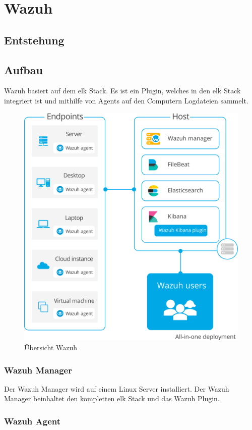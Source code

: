 \chapter{Wazuh}
\section{Entstehung}

\section{Aufbau}
Wazuh basiert auf dem \acrfull{elk} Stack. 
Es ist ein Plugin, welches in den \acrshort{elk} Stack integriert ist und mithilfe von Agents auf den Computern Logdateien sammelt.

\begin{figure}[H]
    \centering
    \includegraphics[width=0.7\linewidth]{../img/aufbau-wazuh.png}
    \caption{Übersicht Wazuh}
\end{figure}

\subsection{Wazuh Manager}
Der Wazuh Manager wird auf einem Linux Server installiert.
Der Wazuh Manager beinhaltet den kompletten \acrshort{elk} Stack und das Wazuh Plugin. 

\subsection{Wazuh Agent}
